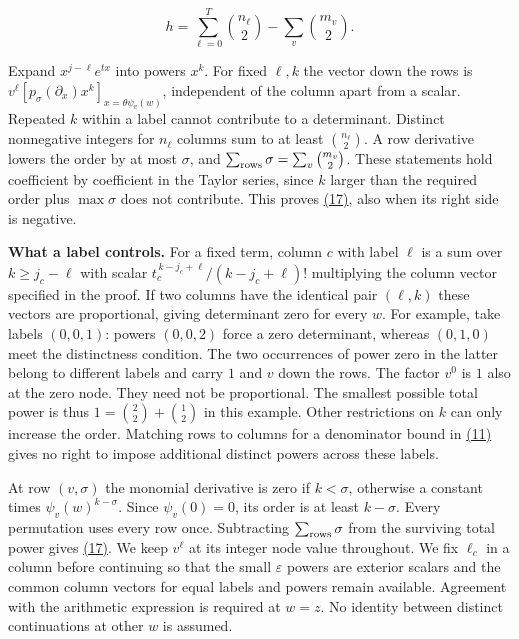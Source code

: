 \documentclass[11pt,a4paper]{article}
\begin{document}
\[
 h=\sum_{\ell=0}^T\binom{n_\ell}{2}-\sum_v\binom{m_v}{2}.                 \tag{17}\label{eq:17}
\]

Expand \(x^{j-\ell}e^{tx}\) into powers \(x^k\). For fixed \(\ell,k\) the vector down the rows is \(v^\ell[p_\sigma(\partial_x)x^k]_{x=\theta\psi_v(w)}\), independent of the column apart from a scalar. Repeated \(k\) within a label cannot contribute to a determinant. Distinct nonnegative integers for \(n_\ell\) columns sum to at least \(\binom{n_\ell}{2}\). A row derivative lowers the order by at most \(\sigma\), and \(\sum_{\rm rows}\sigma=\sum_v\binom{m_v}{2}\). These statements hold coefficient by coefficient in the Taylor series, since \(k\) larger than the required order plus \(\max\sigma\) does not contribute. This proves \hyperref[eq:17]{(17)}, also when its right side is negative.

\textbf{What a label controls.} For a fixed term, column \(c\) with label \(\ell\) is a sum over \(k\ge j_c-\ell\) with scalar \(t_c^{\,k-j_c+\ell}/(k-j_c+\ell)!\) multiplying the column vector specified in the proof. If two columns have the identical pair \((\ell,k)\) these vectors are proportional, giving determinant zero for every \(w\). For example, take labels \((0,0,1)\): powers \((0,0,2)\) force a zero determinant, whereas \((0,1,0)\) meet the distinctness condition. The two occurrences of power zero in the latter belong to different labels and carry \(1\) and \(v\) down the rows. The factor \(v^0\) is \(1\) also at the zero node. They need not be proportional. The smallest possible total power is thus \(1=\binom22+\binom12\) in this example. Other restrictions on \(k\) can only increase the order. Matching rows to columns for a denominator bound in \hyperref[eq:11]{(11)} gives no right to impose additional distinct powers across these labels.

At row \((v,\sigma)\) the monomial derivative is zero if \(k<\sigma\), otherwise a constant times \(\psi_v(w)^{k-\sigma}\). Since \(\psi_v(0)=0\), its order is at least \(k-\sigma\). Every permutation uses every row once. Subtracting \(\sum_{\rm rows}\sigma\) from the surviving total power gives \hyperref[eq:17]{(17)}. We keep \(v^\ell\) at its integer node value throughout. We fix \(\ell_c\) in a column before continuing so that the small \(\varepsilon\) powers are exterior scalars and the common column vectors for equal labels and powers remain available. Agreement with the arithmetic expression is required at \(w=z\). No identity between distinct continuations at other \(w\) is assumed.
\end{document}
